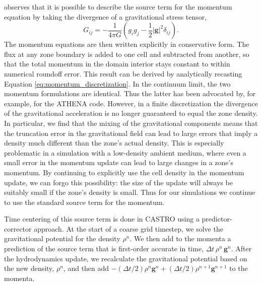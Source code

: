 \documentclass[iop]{emulateapj}
\begin{document}
\citet[Chapter 4]{shu:1992} observes that it is possible to describe the source term 
for the momentum equation by taking the divergence of a gravitational stress tensor,
\begin{equation}
  G_{ij} = -\frac{1}{4\pi G}\left(g_i g_j - \frac{1}{2}|\mathbf{g}|^2\delta_{ij}\right).
\end{equation}
The momentum equations are then written explicitly in conservative form.
The flux at any zone boundary is added to one cell and
subtracted from another, so that the total momentum in the domain interior stays constant to
within numerical roundoff error. This result can be derived by analytically recasting 
Equation \ref{eq:momentum_discretization}. In the continuum limit, the two momentum
formulations are identical. Thus the latter has been advocated by, for example, 
\cite{jiang:2013} for the ATHENA code. However, in a finite discretization 
the divergence of the gravitational acceleration is no longer guaranteed to equal
the zone density. In particular, we find that the mixing of the gravitational components
means that the truncation error in the gravitational field can lead to large errors
that imply a density much different than the zone's actual density. This is especially
problematic in a simulation with a low-density ambient medium, where even a small error 
in the momentum update can lead to large changes in a zone's momentum. By continuing to explicitly
use the cell density in the momentum update, we can forgo this possibility: the size of the update
will always be suitably small if the zone's density is small. Thus for our simulations
we continue to use the standard source term for the momentum.

Time centering of this source term is done in CASTRO using a predictor-corrector approach.
At the start of a coarse grid timestep, we solve the gravitational potential for the density $\rho^n$.
We then add to the momenta a prediction of the source term that is first-order accurate in time, 
$\Delta t\, \rho^n\, \mathbf{g}^n$. After the hydrodynamics update, we recalculate
the gravitational potential based on the new density, $\rho^n$, and then add 
$-(\Delta t/2) \rho^n \mathbf{g}^n + (\Delta t/2) \rho^{n+1} \mathbf{g}^{n+1}$ to the momenta.
\end{document}
